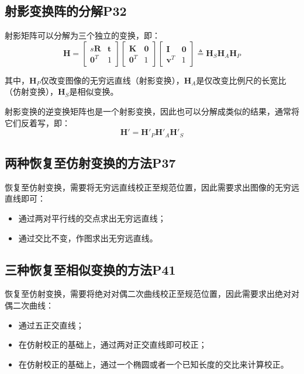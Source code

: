 \documentclass[11pt]{article}
\begin{document}
\subsection{	射影变换阵的分解P32}
射影矩阵可以分解为三个独立的变换，即：
\begin{equation*}
  \mathbold{H}=\begin{bmatrix}
    s\mathbold{R}  & \mathbold{t} \\
    \mathbold{0}^T & 1
  \end{bmatrix}
  \begin{bmatrix}
    \mathbold{K}   & \mathbold{0} \\
    \mathbold{0}^T & 1
  \end{bmatrix}
  \begin{bmatrix}
    \mathbold{I}   & \mathbold{0} \\
    \mathbold{v}^T & 1
  \end{bmatrix}
  \triangleq\mathbold{H}_S\mathbold{H}_A\mathbold{H}_P
\end{equation*}\par
其中，$\mathbold{H}_P$仅改变图像的无穷远直线（射影变换），$\mathbold{H}_A$是仅改变比例尺的长宽比（仿射变换），$\mathbold{H}_S$是相似变换。\par
射影变换的逆变换矩阵也是一个射影变换，因此也可以分解成类似的结果，通常将它们反着写，即：
\begin{equation*}
  \mathbold{H}'=\mathbold{H}'_P\mathbold{H}'_A\mathbold{H}'_S
\end{equation*}\par
\subsection{	两种恢复至仿射变换的方法P37}
恢复至仿射变换，需要将无穷远直线校正至规范位置，因此需要求出图像的无穷远直线即可：
\begin{itemize}
  \item 通过两对平行线的交点求出无穷远直线；
  \item 通过交比不变，作图求出无穷远直线。
\end{itemize}
\subsection{三种恢复至相似变换的方法P41}
恢复至仿射变换，需要将绝对对偶二次曲线校正至规范位置，因此需要求出绝对对偶二次曲线：
\begin{itemize}
  \item 通过五正交直线；
  \item 在仿射校正的基础上，通过两对正交直线即可校正；
  \item 在仿射校正的基础上，通过一个椭圆或者一个已知长度的交比来计算校正。
\end{itemize}
\end{document}
